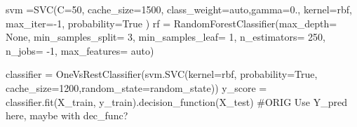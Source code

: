 svm =S\+V\+C(C=50, cache\+\_\+size=1500, class\+\_\+weight=\textquotesingle{}auto\textquotesingle{},gamma=0., kernel=\textquotesingle{}rbf\textquotesingle{}, max\+\_\+iter=-\/1, probability=True ) rf = Random\+Forest\+Classifier(max\+\_\+depth= None, min\+\_\+samples\+\_\+split= 3, min\+\_\+samples\+\_\+leaf= 1, n\+\_\+estimators= 250, n\+\_\+jobs= -\/1, max\+\_\+features= auto) 

classifier = One\+Vs\+Rest\+Classifier(svm.\+S\+V\+C(kernel=\textquotesingle{}rbf\textquotesingle{}, probability=True, cache\+\_\+size=1200,random\+\_\+state=random\+\_\+state)) y\+\_\+score = classifier.\+fit(\+X\+\_\+train, y\+\_\+train).decision\+\_\+function(\+X\+\_\+test) \#\+O\+R\+I\+G Use Y\+\_\+pred here, maybe with dec\+\_\+func? 
